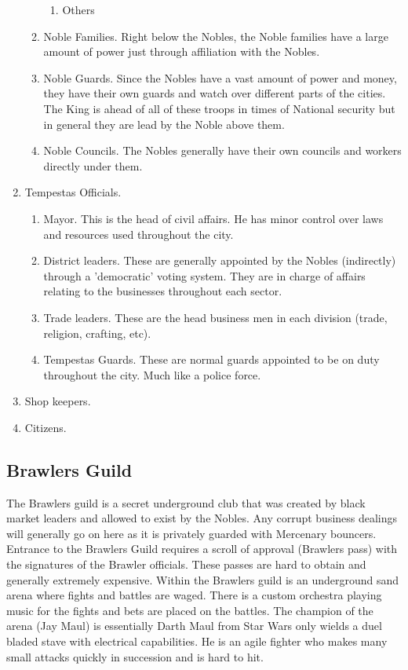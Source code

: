 \begin{enumerate}
\begin{enumerate}
\begin{enumerate}
			\item Others
		\end{enumerate}
		\item Noble Families. Right below the Nobles, the Noble families have a large amount of power just through affiliation with the Nobles.
		\item Noble Guards. Since the Nobles have a vast amount of power and money, they have their own guards and watch over different parts of the cities. The King is ahead of all of these troops in times of National security but in general they are lead by the Noble above them.
		\item Noble Councils. The Nobles generally have their own councils and workers directly under them.
	\end{enumerate}
	\item Tempestas Officials.
	\begin{enumerate}
		\item Mayor. This is the head of civil affairs. He has minor control over laws and resources used throughout the city.
		\item District leaders. These are generally appointed by the Nobles (indirectly) through a 'democratic' voting system. They are in charge of affairs relating to the businesses throughout each sector.
		\item Trade leaders. These are the head business men in each division (trade, religion, crafting, etc).
		\item Tempestas Guards. These are normal guards appointed to be on duty throughout the city. Much like a police force.
	\end{enumerate}
	\item Shop keepers.
	\item Citizens.
\end{enumerate}

\subsection{Brawlers Guild}

The Brawlers guild is a secret underground club that was created by black market leaders and allowed to exist by the Nobles. Any corrupt business dealings will generally go on here as it is privately guarded with Mercenary bouncers. Entrance to the Brawlers Guild requires a scroll of approval (Brawlers pass) with the signatures of the Brawler officials. These passes are hard to obtain and generally extremely expensive. Within the Brawlers guild is an underground sand arena where fights and battles are waged. There is a custom orchestra playing music for the fights and bets are placed on the battles. The champion of the arena (Jay Maul) is essentially Darth Maul from Star Wars only wields a duel bladed stave with electrical capabilities. He is an agile fighter who makes many small attacks quickly in succession and is hard to hit.








